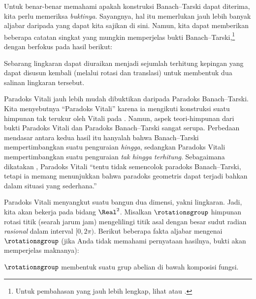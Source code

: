 \documentclass[../../../include/open-logic-section]{subfiles}
\begin{document}

Untuk benar-benar memahami apakah konstruksi Banach--Tarski dapat diterima,
kita perlu memeriksa \emph{buktinya}. Sayangnya, hal itu memerlukan jauh
lebih banyak aljabar daripada yang dapat kita sajikan di sini. Namun, kita
dapat memberikan beberapa catatan singkat yang mungkin memperjelas bukti
Banach--Tarski,\footnote{Untuk pembahasan yang jauh lebih lengkap, lihat
\cite{Weston2003} atau \cite{Wagon2016}.} dengan berfokus pada hasil berikut:

\begin{thm}
Sebarang lingkaran dapat diuraikan menjadi sejumlah terhitung kepingan yang
dapat disusun kembali (melalui rotasi dan translasi) untuk membentuk dua
salinan lingkaran tersebut.
\end{thm}

Paradoks Vitali jauh lebih mudah dibuktikan daripada Paradoks Banach--Tarski.
Kita menyebutnya ``Paradoks Vitali'' karena ia mengikuti konstruksi suatu
himpunan tak terukur oleh Vitali pada \citeyear{Vitali1905}. Namun, aspek
teori-himpunan dari bukti Paradoks Vitali dan Paradoks Banach--Tarski sangat
serupa. Perbedaan mendasar antara kedua hasil itu hanyalah bahwa
Banach--Tarski mempertimbangkan suatu penguraian \emph{hingga}, sedangkan
Paradoks Vitali mempertimbangkan suatu penguraian \emph{tak hingga
terhitung}. Sebagaimana dikatakan \citet{Weston2003}, Paradoks Vitali
``tentu tidak semencolok paradoks Banach--Tarski, tetapi ia memang
menunjukkan bahwa paradoks geometris dapat terjadi bahkan dalam situasi
yang sederhana.''

Paradoks Vitali menyangkut suatu bangun dua dimensi, yakni lingkaran. Jadi,
kita akan bekerja pada bidang $\Real^2$. Misalkan $\rotationsgroup$ himpunan
rotasi titik (searah jarum jam) mengelilingi titik asal dengan besar sudut
radian \emph{rasional} dalam interval $[0,2\pi)$. Berikut beberapa fakta
aljabar mengenai $\rotationsgroup$ (jika Anda tidak memahami pernyataan
hasilnya, bukti akan memperjelas maknanya):

\begin{lem}
$\rotationsgroup$ membentuk suatu grup abelian di bawah komposisi fungsi.
\end{lem}
\end{document}

